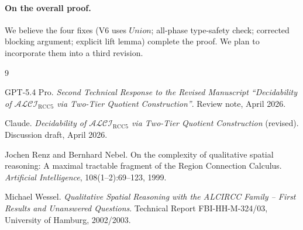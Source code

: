 \documentclass[11pt]{article}
\newcommand{\ALCIRCC}[1]{\mathcal{ALCI}_{\text{RCC#1}}}
\newcommand{\Union}{\mathit{Union}}
\theoremstyle{definition}
\begin{document}
\paragraph{On the overall proof.}
We believe the four fixes (V6 uses $\Union$; all-phase
type-safety check; corrected blocking argument; explicit lift
lemma) complete the proof.  We plan to incorporate them into a
third revision.

\begin{thebibliography}{9}

GPT-5.4 Pro.
\newblock \emph{Second Technical Response to the Revised
Manuscript ``Decidability of $\ALCIRCC{5}$ via Two-Tier
Quotient Construction''}.
\newblock Review note, April 2026.

Claude.
\newblock \emph{Decidability of $\ALCIRCC{5}$ via Two-Tier
Quotient Construction} (revised).
\newblock Discussion draft, April 2026.

Jochen Renz and Bernhard Nebel.
\newblock On the complexity of qualitative spatial reasoning:
A maximal tractable fragment of the Region Connection Calculus.
\newblock \emph{Artificial Intelligence}, 108(1--2):69--123,
1999.

Michael Wessel.
\newblock \emph{Qualitative Spatial Reasoning with the ALCIRCC
Family -- First Results and Unanswered Questions}.
\newblock Technical Report FBI-HH-M-324/03, University of
Hamburg, 2002/2003.

\end{thebibliography}
\end{document}
